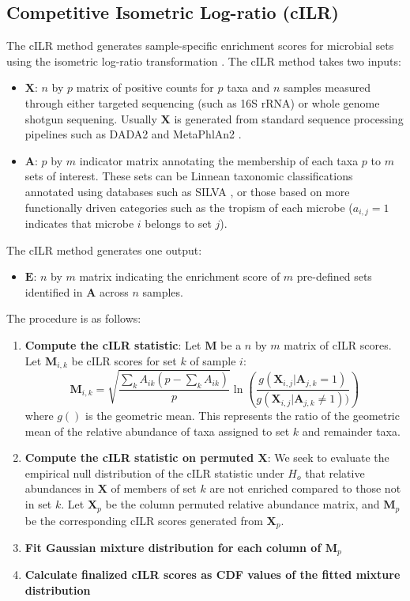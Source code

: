 \documentclass{article}
\begin{document}
\subsection*{Competitive Isometric Log-ratio (cILR)}
The cILR method generates sample-specific enrichment scores for microbial sets using the isometric log-ratio transformation \cite{egozcue2003}. The cILR method takes two inputs:  
\begin{itemize}
    \item $\mathbf{X}$: $n$ by $p$ matrix of positive counts for $p$ taxa and $n$ samples measured through either targeted sequencing (such as 16S rRNA) or whole genome shotgun sequening. Usually $\mathbf{X}$ is generated from standard sequence processing pipelines such as DADA2 \cite{callahan2016} and MetaPhlAn2 \cite{truong2015}. 
    \item $\mathbf{A}$: $p$ by $m$ indicator matrix annotating the membership of each taxa $p$ to $m$ sets of interest. These sets can be Linnean taxonomic classifications annotated using databases such as SILVA \cite{quast2013}, or those based on more functionally driven categories such as the tropism of each microbe ($a_{i,j} = 1$ indicates that microbe $i$ belongs to set $j$). 
\end{itemize}
The cILR method generates one output:  
\begin{itemize}
    \item $\mathbf{E}$: $n$ by $m$ matrix indicating the enrichment score of $m$ pre-defined sets identified in $\mathbf{A}$ across $n$ samples. 
\end{itemize}
The procedure is as follows:  
\begin{enumerate}
    \item \textbf{Compute the cILR statistic}: Let $\mathbf{M}$ be a $n$ by $m$ matrix of cILR scores. Let $\mathbf{M}_{i,k}$ be cILR scores for set $k$ of sample $i$:   
    $$\mathbf{M}_{i,k} = \sqrt{\frac{\sum_k A_{ik}(p - \sum_k A_{ik})}{p}} \ln \left( \frac{g(\mathbf{X}_{i,j}|\mathbf{A}_{j,k} = 1)}{g(\mathbf{X}_{i,j}|\mathbf{A}_{j,k} \neq 1))} \right)$$
    where $g()$ is the geometric mean. This represents the ratio of the geometric mean of the relative abundance of taxa assigned to set $k$ and remainder taxa.   
    \item \textbf{Compute the cILR statistic on permuted $\mathbf{X}$}: We seek to evaluate the empirical null distribution of the cILR statistic under $H_o$ that relative abundances in $\mathbf{X}$ of members of set $k$ are not enriched compared to those not in set $k$. Let $\mathbf{X}_p$ be the column permuted relative abundance matrix, and $\mathbf{M}_p$ be the corresponding cILR scores generated from $\mathbf{X}_p$. 
    \item \textbf{Fit Gaussian mixture distribution for each column of $\mathbf{M}_p$}
    \item \textbf{Calculate finalized cILR scores as CDF values of the fitted mixture distribution}
\end{enumerate}
\end{document}
